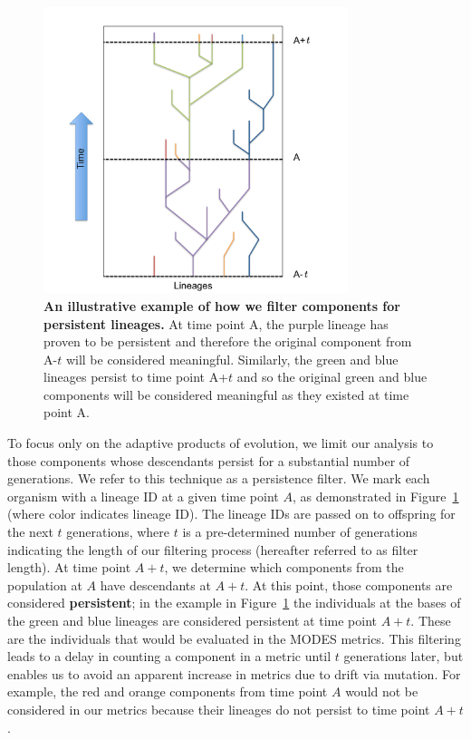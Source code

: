 \documentclass[letterpaper]{article}
\begin{document}
\begin{figure}
    \centering
\includegraphics[width=3.5in]{figs/dolson.LineageFigure.png}
\caption{\textbf{An illustrative example of how we filter components for persistent lineages.} At time point A, the purple lineage has proven to be persistent and therefore the original component from A-$t$ will be considered meaningful. Similarly, the green and blue lineages persist to time point A+$t$ and so the original green and blue components will be considered meaningful as they existed at time point A.\label{lineages}}
\end{figure}

To focus only on the adaptive products of evolution, we limit our analysis to those components whose descendants persist for a substantial number of generations. We refer to this technique as a persistence filter. We mark each organism with a lineage ID at a given time point $A$, as demonstrated in Figure~\ref{lineages} (where color indicates lineage ID). The lineage IDs are passed on to offspring for the next $t$ generations, where $t$ is a pre-determined number of generations indicating the length of our filtering process (hereafter referred to as filter length). At time point $A+t$, we determine which components from the population at $A$ have descendants at $A+t$. At this point, those components are considered \textbf{persistent}; in the example in Figure~\ref{lineages} the individuals at the bases of the green and blue lineages are considered persistent at time point $A+t$. These are the individuals that would be evaluated in the MODES metrics. This filtering leads to a delay in counting a component in a metric until $t$ generations later, but enables us to avoid an apparent increase in metrics due to drift via mutation. For example, the red and orange components from time point $A$ would not be considered in our metrics because their lineages do not persist to time point $A+t$.
    
\end{document}
